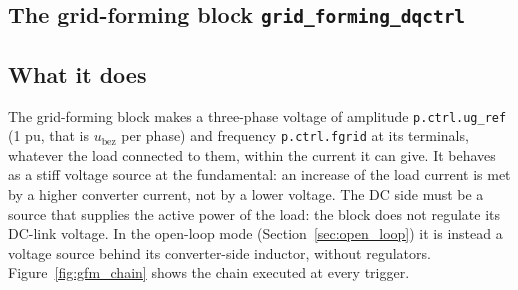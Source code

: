 \documentclass[11pt,a4paper]{scrartcl}
\newcommand{\ped}[1]{_{\mathrm{#1}}}
\newcommand{\code}[1]{\texttt{#1}}
\begin{document}
\begin{onehalfspace}
\section{The grid-forming block \code{grid\_forming\_dqctrl}}
\label{sec:gfm}

\subsection{What it does}
\label{sec:gfm_purpose}

The grid-forming block makes a three-phase voltage of amplitude \code{p.ctrl.ug\_ref} (1 pu, that is $u\ped{bez}$ per phase) and frequency \code{p.ctrl.fgrid} at its terminals, whatever the load connected to them, within the current it can give. It behaves as a stiff voltage source at the fundamental: an increase of the load current is met by a higher converter current, not by a lower voltage. The DC side must be a source that supplies the active power of the load: the block does not regulate its DC-link voltage. In the open-loop mode (Section~\ref{sec:open_loop}) it is instead a voltage source behind its converter-side inductor, without regulators. Figure~\ref{fig:gfm_chain} shows the chain executed at every trigger.


\end{onehalfspace}
\end{document}
